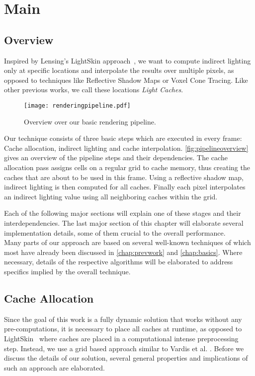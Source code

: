 \documentclass[thesis.tex]{subfiles}
\begin{document}
\chapter{Main}\label{chap:basics}

\section{Overview}
Inspired by Lensing's LightSkin approach~\cite{bib:LightskinPaper}, we want to compute indirect lighting only at specific locations and interpolate the results over multiple pixels, as opposed to techniques like Reflective Shadow Maps or Voxel Cone Tracing.
Like other previous works, we call these locations \emph{Light Caches}.

\begin{figure}[h]
	\centering
	\texttt{[image: renderingpipeline.pdf]}
	\caption{Overview over our basic rendering pipeline.}
	\label{fig:pipelineoverview}
\end{figure} 
Our technique consists of three basic steps which are executed in every frame: Cache allocation, indirect lighting and cache interpolation.
\autoref{fig:pipelineoverview} gives an overview of the pipeline steps and their dependencies.
The cache allocation pass assigns cells on a regular grid to cache memory, thus creating the caches that are about to be used in this frame.
Using a reflective shadow map, indirect lighting is then computed for all caches.
Finally each pixel interpolates an indirect lighting value using all neighboring caches within the grid.

Each of the following major sections will explain one of these stages and their interdependencies.
The last major section of this chapter will elaborate several implementation details, some of them crucial to the overall performance.\\
Many parts of our approach are based on several well-known techniques of which most have already been discussed in \autoref{chap:prevwork} and \autoref{chap:basics}.
Where necessary, details of the respective algorithms will be elaborated to address specifics implied by the overall technique.

\section{Cache Allocation}
Since the goal of this work is a fully dynamic solution that works without any pre-computations, it is necessary to place all caches at runtime, as opposed to LightSkin~\cite{bib:LightskinPaper} where caches are placed in a computational intense preprocessing step.
Instead, we use a grid based approach similar to Vardis et al. \cite{bib:radiancecachechromaticcompression}.
Before we discuss the details of our solution, several general properties and implications of such an approach are elaborated.
\end{document}
